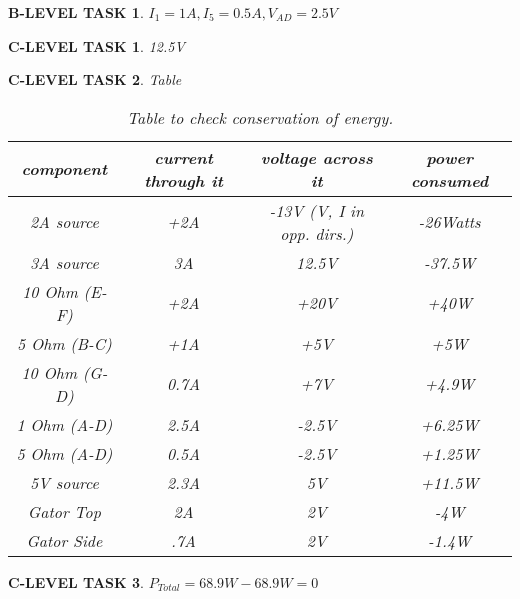 \documentclass{book}
\numberwithin{equation}{section}
\newtheorem{blevel}{B-LEVEL TASK}
\newtheorem{clevel}{C-LEVEL TASK}
\theoremstyle{definition}
\begin{document}
\begin{blevel}$I_1=1A,I_5=0.5A,V_{AD}=2.5V$\end{blevel}
\begin{clevel}12.5V\end{clevel}
\begin{clevel}Table\par
\begin{table}[H]
\begin{center}
\begin{tabular}{|c|c|c|c|} \hline
component &	current through it	& voltage across it	& power consumed \\ \hline
2A source	&+2A			&-13V (V, I in opp. dirs.)	&-26Watts\\ \hline
3A source	&3A			&12.5V	&-37.5W	\\ \hline
10 Ohm (E-F)	&+2A			&+20V	&+40W	\\ \hline
5 Ohm (B-C)	&+1A			&+5V	&+5W	\\ \hline
10 Ohm (G-D)	&0.7A			&+7V	&+4.9W	\\ \hline
1 Ohm (A-D)	&2.5A			&-2.5V	&+6.25W	\\ \hline
5 Ohm (A-D)	&0.5A			&-2.5V	&+1.25W	\\ \hline
5V source	&2.3A			&5V	&+11.5W	\\ \hline
Gator Top	&2A			&2V	&-4W	\\ \hline
Gator Side	&.7A			&2V	&-1.4W	\\ \hline
\end{tabular}
\caption{Table to check conservation of energy.}
\label{F:3CKT3}
\end{center}
\end{table}
\end{clevel}

\begin{clevel}$P_{Total}=68.9W-68.9W=0$\end{clevel}
\end{document}
